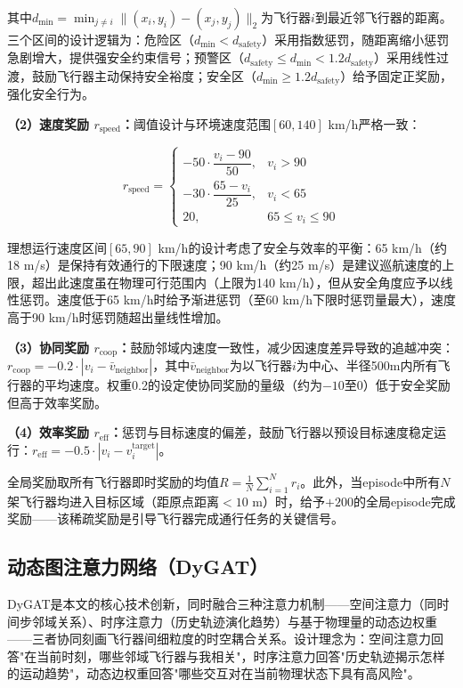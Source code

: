 \documentclass[12pt,a4paper,UTF8]{ctexart}
\begin{document}
其中$d_{\min} = \min_{j \neq i} \|(x_i, y_i) - (x_j, y_j)\|_2$为飞行器$i$到最近邻飞行器的距离。三个区间的设计逻辑为：危险区（$d_{\min} < d_{\text{safety}}$）采用指数惩罚，随距离缩小惩罚急剧增大，提供强安全约束信号；预警区（$d_{\text{safety}} \leq d_{\min} < 1.2d_{\text{safety}}$）采用线性过渡，鼓励飞行器主动保持安全裕度；安全区（$d_{\min} \geq 1.2d_{\text{safety}}$）给予固定正奖励，强化安全行为。

\textbf{（2）速度奖励 $r_{\text{speed}}$：}阈值设计与环境速度范围$[60, 140]$ km/h严格一致：

\begin{equation}
    r_{\text{speed}} =
    \begin{cases}
        -50 \cdot \dfrac{v_i - 90}{50}, & v_i > 90 \\[8pt]
        -30 \cdot \dfrac{65 - v_i}{25}, & v_i < 65 \\[8pt]
        20, & 65 \leq v_i \leq 90
    \end{cases}
\end{equation}

理想运行速度区间$[65, 90]$ km/h的设计考虑了安全与效率的平衡：65 km/h（约18 m/s）是保持有效通行的下限速度；90 km/h（约25 m/s）是建议巡航速度的上限，超出此速度虽在物理可行范围内（上限为140 km/h），但从安全角度应予以线性惩罚。速度低于65 km/h时给予渐进惩罚（至60 km/h下限时惩罚量最大），速度高于90 km/h时惩罚随超出量线性增加。

\textbf{（3）协同奖励 $r_{\text{coop}}$：}鼓励邻域内速度一致性，减少因速度差异导致的追越冲突：$r_{\text{coop}} = -0.2 \cdot |v_i - \bar{v}_{\text{neighbor}}|$，其中$\bar{v}_{\text{neighbor}}$为以飞行器$i$为中心、半径500m内所有飞行器的平均速度。权重0.2的设定使协同奖励的量级（约为$-10$至$0$）低于安全奖励但高于效率奖励。

\textbf{（4）效率奖励 $r_{\text{eff}}$：}惩罚与目标速度的偏差，鼓励飞行器以预设目标速度稳定运行：$r_{\text{eff}} = -0.5 \cdot |v_i - v_i^{\text{target}}|$。

全局奖励取所有飞行器即时奖励的均值$R = \frac{1}{N}\sum_{i=1}^{N} r_i$。此外，当episode中所有$N$架飞行器均进入目标区域（距原点距离$< 10$ m）时，给予$+200$的全局episode完成奖励——该稀疏奖励是引导飞行器完成通行任务的关键信号。

\subsection{动态图注意力网络（DyGAT）}

DyGAT是本文的核心技术创新，同时融合三种注意力机制——空间注意力（同时间步邻域关系）、时序注意力（历史轨迹演化趋势）与基于物理量的动态边权重——三者协同刻画飞行器间细粒度的时空耦合关系。设计理念为：空间注意力回答"在当前时刻，哪些邻域飞行器与我相关"，时序注意力回答"历史轨迹揭示怎样的运动趋势"，动态边权重回答"哪些交互对在当前物理状态下具有高风险"。
\end{document}
